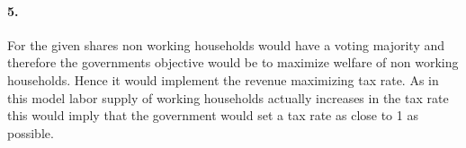 \paragraph{5.}
For the given shares non working households would have a voting majority and therefore the governments objective would be to maximize welfare of non working households. Hence it would implement the revenue maximizing tax rate. As in this model labor supply of working households actually increases in the tax rate this would imply that the government would set a tax rate as close to 1 as possible.